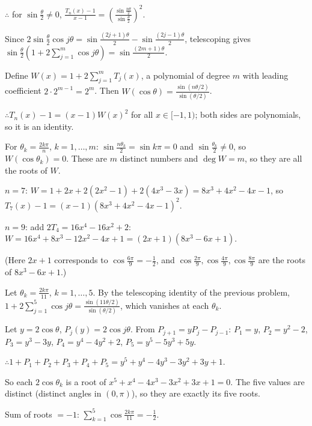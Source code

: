   $\therefore$ for $\sin\frac{\theta}{2}\neq 0$, $\frac{T_n(x) - 1}{x - 1} = \left(\frac{\sin\frac{n\theta}{2}}{\sin
    \frac{\theta}{2}}\right)^2$.

  Since $2\sin\frac{\theta}{2}\cos j\theta = \sin\frac{(2j + 1)\theta}{2} - \sin\frac{(2j - 1)\theta}{2}$,
  telescoping gives $\sin\frac{\theta}{2}\left(1 + 2\displaystyle\sum_{j = 1}^{m}\cos j\theta\right)
  = \sin\frac{(2m + 1)\theta}{2}$.

  Define $W(x) = 1 + 2\displaystyle\sum_{j = 1}^{m}T_j(x)$, a polynomial of degree $m$ with leading coefficient
  $2\cdot 2^{m - 1} = 2^m$. Then $W(\cos\theta) = \frac{\sin(n\theta/2)}{\sin(\theta/2)}$.

  $\therefore T_n(x) - 1 = (x - 1)W(x)^2$ for all $x\in[-1, 1)$; both sides are polynomials, so it is an identity.

  For $\theta_k = \frac{2k\pi}{n}$, $k = 1, \ldots, m$: $\sin\frac{n\theta_k}{2} = \sin k\pi = 0$ and
  $\sin\frac{\theta_k}{2}\neq 0$, so $W(\cos\theta_k) = 0$. These are $m$ distinct numbers and $\deg W = m$, so
  they are all the roots of $W$.

  $n = 7$: $W = 1 + 2x + 2(2x^2 - 1) + 2(4x^3 - 3x) = 8x^3 + 4x^2 - 4x - 1$, so $T_7(x) - 1 = (x - 1)(8x^3 + 4x^2 -
  4x - 1)^2$.

  $n = 9$: add $2T_4 = 16x^4 - 16x^2 + 2$: $W = 16x^4 + 8x^3 - 12x^2 - 4x + 1 = (2x + 1)(8x^3 - 6x + 1)$.

  (Here $2x + 1$ corresponds to $\cos\frac{6\pi}{9} = -\frac{1}{2}$, and $\cos\frac{2\pi}{9}, \cos\frac{4\pi}{9},
  \cos\frac{8\pi}{9}$ are the roots of $8x^3 - 6x + 1$.)
\item Let $\theta_k = \frac{2k\pi}{11}$, $k = 1, \ldots, 5$. By the telescoping identity of the previous
  problem, $1 + 2\displaystyle\sum_{j = 1}^{5}\cos j\theta = \frac{\sin(11\theta/2)}{\sin(\theta/2)}$, which
  vanishes at each $\theta_k$.

  Let $y = 2\cos\theta$, $P_j(y) = 2\cos j\theta$. From $P_{j + 1} = yP_j - P_{j - 1}$: $P_1 = y$, $P_2 = y^2 - 2$,
  $P_3 = y^3 - 3y$, $P_4 = y^4 - 4y^2 + 2$, $P_5 = y^5 - 5y^3 + 5y$.

  $\therefore 1 + P_1 + P_2 + P_3 + P_4 + P_5 = y^5 + y^4 - 4y^3 - 3y^2 + 3y + 1$.

  So each $2\cos\theta_k$ is a root of $x^5 + x^4 - 4x^3 - 3x^2 + 3x + 1 = 0$. The five values are distinct
  (distinct angles in $(0, \pi)$), so they are exactly its five roots.

  Sum of roots $= -1$: $\displaystyle\sum_{k = 1}^{5}\cos\frac{2k\pi}{11} = -\frac{1}{2}$.

